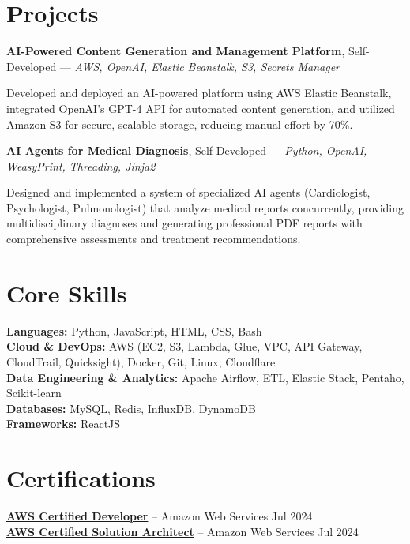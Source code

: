 \documentclass[10pt, letterpaper]{article}
\begin{document}
\section{Projects}
\textbf{\textcolor{myNavy}{AI-Powered Content Generation and Management Platform}}, Self-Developed — \textit{\textcolor{myBlue}{AWS, OpenAI, Elastic Beanstalk, S3, Secrets Manager}}

Developed and deployed an AI-powered platform using AWS Elastic Beanstalk, integrated OpenAI's GPT-4 API for automated content generation, and utilized Amazon S3 for secure, scalable storage, reducing manual effort by 70\%.

\vspace{0.05cm}

\textbf{\textcolor{myNavy}{AI Agents for Medical Diagnosis}}, Self-Developed — \textit{\textcolor{myBlue}{Python, OpenAI, WeasyPrint, Threading, Jinja2}}

Designed and implemented a system of specialized AI agents (Cardiologist, Psychologist, Pulmonologist) that analyze medical reports concurrently, providing multidisciplinary diagnoses and generating professional PDF reports with comprehensive assessments and treatment recommendations.

\vspace{0.08cm}

\section{Core Skills}
\textbf{\textcolor{myNavy}{Languages:}} Python, JavaScript, HTML, CSS, Bash \\
\textbf{\textcolor{myNavy}{Cloud \& DevOps:}} AWS (EC2, S3, Lambda, Glue, VPC, API Gateway, CloudTrail, Quicksight), Docker, Git, Linux, Cloudflare \\
\textbf{\textcolor{myNavy}{Data Engineering \& Analytics:}} Apache Airflow, ETL, Elastic Stack, Pentaho, Scikit-learn \\
\textbf{\textcolor{myNavy}{Databases:}} MySQL, Redis, InfluxDB, DynamoDB \\
\textbf{\textcolor{myNavy}{Frameworks:}} ReactJS

\vspace{0.08cm}

\section{Certifications}
\textbf{\href{https://cp.certmetrics.com/amazon/en/public/verify/credential/dc7c20379cf94f2699a4d430c31ac969}{AWS Certified Developer}} -- Amazon Web Services \hfill \textcolor{myDarkGray}{Jul 2024} \\
\textbf{\href{https://cp.certmetrics.com/amazon/en/public/verify/credential/7ec7fce4db1f4b1bab3b6f8caa3f509b}{AWS Certified Solution Architect}} -- Amazon Web Services \hfill \textcolor{myDarkGray}{Jul 2024}
\end{document}
